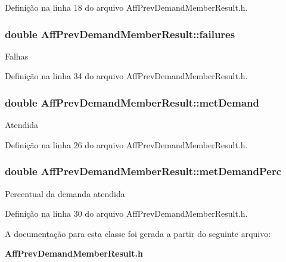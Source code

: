 Definição na linha 18 do arquivo Aff\+Prev\+Demand\+Member\+Result.\+h.

\subsubsection[{failures}]{\setlength{\rightskip}{0pt plus 5cm}double Aff\+Prev\+Demand\+Member\+Result\+::failures}\label{class_aff_prev_demand_member_result_a36a04bebffb8a93aaeaa7fff4907f565}
Falhas 

Definição na linha 34 do arquivo Aff\+Prev\+Demand\+Member\+Result.\+h.

\subsubsection[{met\+Demand}]{\setlength{\rightskip}{0pt plus 5cm}double Aff\+Prev\+Demand\+Member\+Result\+::met\+Demand}\label{class_aff_prev_demand_member_result_ae401c6608de40759f45e02891a7ed566}
Atendida 

Definição na linha 26 do arquivo Aff\+Prev\+Demand\+Member\+Result.\+h.

\subsubsection[{met\+Demand\+Perc}]{\setlength{\rightskip}{0pt plus 5cm}double Aff\+Prev\+Demand\+Member\+Result\+::met\+Demand\+Perc}\label{class_aff_prev_demand_member_result_a7166053b7540266bb30dd96a19d6ccee}
Percentual da demanda atendida 

Definição na linha 30 do arquivo Aff\+Prev\+Demand\+Member\+Result.\+h.



A documentação para esta classe foi gerada a partir do seguinte arquivo\+:\begin{DoxyCompactItemize}
\item 
{\bf Aff\+Prev\+Demand\+Member\+Result.\+h}\end{DoxyCompactItemize}
